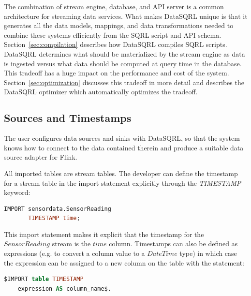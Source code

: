 \documentclass[	DIV=calc,%
							paper=letter,%
							fontsize=11pt,%
							twocolumn]{scrartcl}	 					%
\begin{document}
The combination of stream engine, database, and API server is a common architecture for streaming data services. What makes DataSQRL unique is that it generates all the data models, mappings, and data transformations needed to combine these systems efficiently from the SQRL script and API schema. Section~\ref{sec:compilation} describes how DataSQRL compiles SQRL scripts. DataSQRL determines what should be materialized by the stream engine as data is ingested versus what data should be computed at query time in the database. This tradeoff has a huge impact on the performance and cost of the system. Section~\ref{sec:optimization} discusses this tradeoff in more detail and describes the DataSQRL optimizer which automatically optimizes the tradeoff.

\subsection{Sources and Timestamps}
\label{sec:datasqrl-source}

The user configures data sources and sinks with DataSQRL, so that the system knows how to connect to the data contained therein and produce a suitable data source adapter for Flink.

All imported tables are stream tables. The developer can define the timestamp for a stream table in the import statement explicitly through the \emph{TIMESTAMP} keyword:
\begin{lstlisting}[language=SQL]
IMPORT sensordata.SensorReading
       TIMESTAMP time;
\end{lstlisting}

This import statement makes it explicit that the timestamp for the $SensorReading$ stream is the $time$ column. Timestamps can also be defined as expressions (e.g. to convert a column value to a $DateTime$ type) in which case the expression can be assigned to a new column on the table with the statement:

\begin{lstlisting}[language=SQL]
$IMPORT table TIMESTAMP
    expression AS column_name$.
\end{lstlisting}
\end{document}
